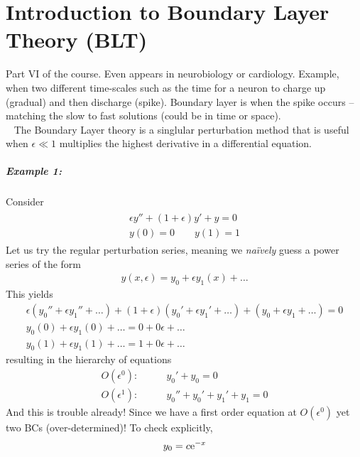 \chapter[Boundary layer theory]{Introduction to Boundary Layer Theory (BLT)}
Part VI of the course. Even appears in neurobiology or cardiology. Example, when two different time-scales such as the time for a neuron to charge up (gradual) and then discharge (spike). Boundary layer is when the spike occurs -- matching the slow to fast solutions (could be in time or space). \\
\ \newline
The Boundary Layer theory is a singlular perturbation method that is useful when $\epsilon \ll 1$ multiplies the highest derivative in a differential equation.

\paragraph{Example 1:} Consider
\begin{gather}\label{eqn:wk12-ex1-ode}
	\begin{split}
	\epsilon y'' + (1+\epsilon)y' + y = 0 \\
		y(0)=0 \qquad y(1)=1
	\end{split}
\end{gather}
Let us try the regular perturbation series, meaning we \emph{na\"{i}vely} guess a power series of the form
\begin{gather*}
	y(x,\epsilon) = y_0 + \epsilon y_1(x) + \dots 
\end{gather*}
This yields
\begin{gather*}
	\epsilon (y_0'' + \epsilon y_1'' + \dots) + (1+\epsilon)(y_0' + \epsilon y_1' + \dots ) + (y_0 + \epsilon y_1+\dots ) = 0 \\
	y_0(0) + \epsilon y_1(0) + \dots = 0 + 0\epsilon + \dots \\
	y_0(1) + \epsilon y_1(1) + \dots = 1 + 0\epsilon + \dots
\end{gather*}
resulting in the hierarchy of equations
\begin{align*}
	O(\epsilon^0): \qquad & y_0' + y_0 = 0 \\
	O(\epsilon^1): \qquad & y_0'' + y_0' + y_1' + y_1 = 0
\end{align*}
And this is trouble already! Since we have a first order equation at $O(\epsilon^0)$ yet two BCs (over-determined)! To check explicitly,
\begin{gather*}
	y_0 = c\mathrm{e}^{-x}
\end{gather*}
